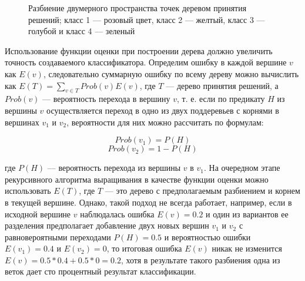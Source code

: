 \documentclass[a4paper,14pt]{extarticle} %
\begin{document}
\begin{figure}[h]
\begin{minipage}[h]{0.49\linewidth}
\end{minipage}
\hfill
\begin{minipage}[h]{0.49\linewidth}
\end{minipage}
\caption{Разбиение двумерного пространства точек деревом принятия решений; класс 1 --- розовый цвет, класс 2 --- желтый, класс 3 --- голубой и класс 4 --- зеленый}
\label{fig:range-split}
\end{figure}

Использование функции оценки при построении дерева должно увеличить точность создаваемого классификатора. Определим ошибку в каждой вершине $v$ как $E(v)$, следовательно суммарную ошибку по всему дереву можно вычислить как $E(T) = \sum\limits_{v \in T} Prob(v)E(v)$, где $T$ --- дерево принятия решений, а $Prob(v)$ --- вероятность перехода в вершину $v$, т. е. если по предикату $H$ из вершины $v$ осуществляется переход в одно из двух поддеревьев с корнями в вершинах $v_1$ и $v_2$, вероятности для них можно рассчитать по формулам:

$$
Prob(v_1) = P(H)
$$
$$
Prob(v_2) = 1 - P(H)
$$

\noindent где $P(H)$ --- вероятность перехода из вершины $v$ в $v_1$. На очередном этапе рекурсивного алгоритма выращивания в качестве функции оценки можно использовать $E(T)$, где $T$ --- это дерево с предполагаемым разбиением и корнем в текущей вершине. Однако, такой подход не всегда работает, например, если в исходной вершине $v$ наблюдалась ошибка $E(v)=0.2$ и один из вариантов ее разделения предполагает добавление двух новых вершин $v_1$ и $v_2$ с равновероятными переходами $P(H)=0.5$ и вероятностью ошибки $E(v_1)=0.4$ и $E(v_2)=0$, то итоговая ошибка $E(v)$ никак не изменится $E(v)=0.5*0.4+0.5*0=0.2$, хотя в результате такого разбиения одна из веток дает сто процентный результат классификации.
\end{document}
